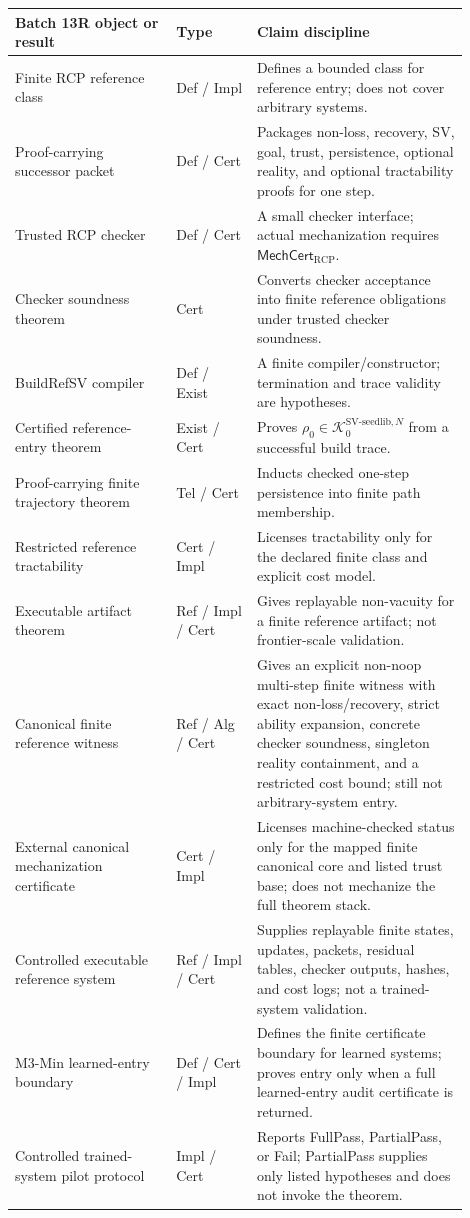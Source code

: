\documentclass[11pt]{article}
\newcommand{\1}{\mathbf{1}}
\newcommand{\RCP}{\mathrm{RCP}}
\providecommand{\Kcal}{\mathcal{K}}
\begin{document}
\begin{center}
\begin{tabular}{@{}p{0.32\linewidth}p{0.16\linewidth}p{0.42\linewidth}@{}}
\toprule
\textbf{Batch 13R object or result} & \textbf{Type} & \textbf{Claim discipline}\\
\midrule
Finite RCP reference class & Def / Impl & Defines a bounded class for reference entry; does not cover arbitrary systems.\\
Proof-carrying successor packet & Def / Cert & Packages non-loss, recovery, SV, goal, trust, persistence, optional reality, and optional tractability proofs for one step.\\
Trusted RCP checker & Def / Cert & A small checker interface; actual mechanization requires \(\mathsf{MechCert}_{\RCP}\).\\
Checker soundness theorem & Cert & Converts checker acceptance into finite reference obligations under trusted checker soundness.\\
BuildRefSV compiler & Def / Exist & A finite compiler/constructor; termination and trace validity are hypotheses.\\
Certified reference-entry theorem & Exist / Cert & Proves \(\rho_0\in\Kcal_0^{\mathrm{SV\mbox{-}seedlib},N}\) from a successful build trace.\\
Proof-carrying finite trajectory theorem & Tel / Cert & Inducts checked one-step persistence into finite path membership.\\
Restricted reference tractability & Cert / Impl & Licenses tractability only for the declared finite class and explicit cost model.\\
Executable artifact theorem & Ref / Impl / Cert & Gives replayable non-vacuity for a finite reference artifact; not frontier-scale validation.\\
Canonical finite reference witness & Ref / Alg / Cert & Gives an explicit non-noop multi-step finite witness with exact non-loss/recovery, strict ability expansion, concrete checker soundness, singleton reality containment, and a restricted cost bound; still not arbitrary-system entry.\\
External canonical mechanization certificate & Cert / Impl & Licenses machine-checked status only for the mapped finite canonical core and listed trust base; does not mechanize the full theorem stack.\\
Controlled executable reference system & Ref / Impl / Cert & Supplies replayable finite states, updates, packets, residual tables, checker outputs, hashes, and cost logs; not a trained-system validation.\\
M3-Min learned-entry boundary & Def / Cert / Impl & Defines the finite certificate boundary for learned systems; proves entry only when a full learned-entry audit certificate is returned.\\
Controlled trained-system pilot protocol & Impl / Cert & Reports FullPass, PartialPass, or Fail; PartialPass supplies only listed hypotheses and does not invoke the theorem.\\
\bottomrule
\end{tabular}
\end{center}
\end{document}
